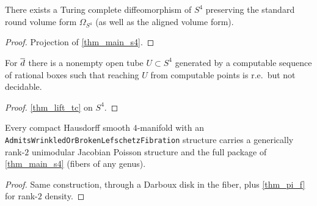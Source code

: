 \begin{theorem}
\label{thm_s4_short}
\leanok
{}
There exists a Turing complete diffeomorphism of $S^4$ preserving the standard round volume form
$\Omega_{S^4}$ (as well as the aligned volume form).
\end{theorem}
\begin{proof}\leanok
Projection of \cref{thm_main_s4}.
\end{proof}

\begin{theorem}[Undecidability on $S^4$]
\label{thm_undecidable_s4}
\leanok
{}
For $\overline{d}$ there is a nonempty open tube $U\subset S^4$ generated by a computable sequence of
rational boxes such that reaching $U$ from computable points is r.e.\ but not decidable.
\end{theorem}
\begin{proof}\leanok
\cref{thm_lift_tc} on $S^4$.
\end{proof}

\begin{theorem}
\label{thm_cor2}
\leanok
{}
Every compact Hausdorff smooth $4$-manifold with an
\texttt{AdmitsWrinkledOrBrokenLefschetzFibration} structure carries a generically rank-$2$
unimodular Jacobian Poisson structure and the full package of \cref{thm_main_s4} (fibers of any genus).
\end{theorem}
\begin{proof}\leanok
Same construction, through a Darboux disk in the fiber, plus \cref{thm_pi_f} for rank-$2$ density.
\end{proof}

